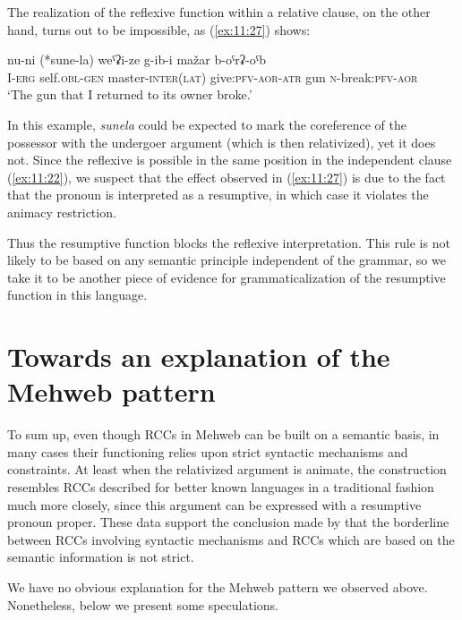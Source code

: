 ﻿\documentclass[output=paper]{langsci/langscibook}
\begin{document}
The realization of the reflexive function within a relative clause, on
the other hand, turns out to be impossible, as (\ref{ex:11:27}) shows:

\ea \label{ex:11:27} %
\gll  nu-ni (*sune-la) weˤʡi-ze g-ib-i   mažar b-oˤrʡ-oˤb\\
  I-\textsc{erg} self.\textsc{obl}-\textsc{gen}  master-\textsc{inter}(\textsc{lat}) give:\textsc{pfv}-\textsc{aor}-\textsc{atr}  gun \textsc{n}-break:\textsc{pfv}-\textsc{aor}\\
\glt
  `The gun that I returned to its owner broke.'
\z

In this example, \emph{sunela} could be expected to mark the coreference
of the possessor with the undergoer argument (which is then
relativized), yet it does not. Since the reflexive is possible in the
same position in the independent clause (\ref{ex:11:22}), we suspect that the effect
observed in (\ref{ex:11:27}) is due to the fact that the pronoun is interpreted as a
resumptive, in which case it violates the animacy restriction.

Thus the resumptive function blocks the reflexive interpretation. This
rule is not likely to be based on any semantic principle independent of
the grammar, so we take it to be another piece of evidence for
grammaticalization of the resumptive function in this language.

\section{Towards an explanation of the Mehweb pattern}\label{towards-an-explanation-of-the-Mehweb-pattern}

To sum up, even though RCCs in Mehweb can be built on a semantic basis,
in many cases their functioning relies upon strict syntactic mechanisms
and constraints. At least when the relativized argument is animate, the
construction resembles RCCs described for better known languages in a
traditional fashion much more closely, since this argument can be
expressed with a resumptive pronoun proper. These data support the
conclusion made by \citet{daniel-lander2013} that the borderline between
RCCs involving syntactic mechanisms and RCCs which are based on the
semantic information is not strict.

We have no obvious explanation for the Mehweb pattern we observed above.
Nonetheless, below we present some speculations.
\end{document}
